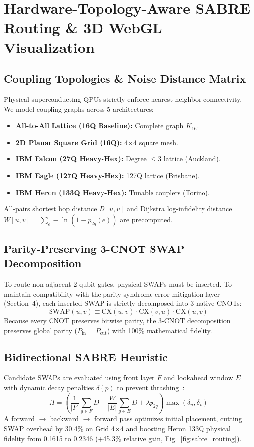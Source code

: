 \documentclass[10pt,twocolumn,letterpaper]{article}
\begin{document}
\section{Hardware-Topology-Aware SABRE Routing \& 3D WebGL Visualization}

\subsection{Coupling Topologies \& Noise Distance Matrix}
Physical superconducting QPUs strictly enforce nearest-neighbor connectivity. We model coupling graphs across 5 architectures:
\begin{itemize}[leftmargin=1.15em, itemsep=0.5pt]
    \item \textbf{All-to-All Lattice (16Q Baseline):} Complete graph $K_{16}$.
    \item \textbf{2D Planar Square Grid (16Q):} 4$\times$4 square mesh.
    \item \textbf{IBM Falcon (27Q Heavy-Hex):} Degree $\le 3$ lattice (Auckland).
    \item \textbf{IBM Eagle (127Q Heavy-Hex):} 127Q lattice (Brisbane).
    \item \textbf{IBM Heron (133Q Heavy-Hex):} Tunable couplers (Torino).
\end{itemize}
All-pairs shortest hop distance $D[u, v]$ and Dijkstra log-infidelity distance $W[u, v] = \sum_{e} -\ln(1 - p_{2q}(e))$ are precomputed.

\subsection{Parity-Preserving 3-CNOT SWAP Decomposition}
To route non-adjacent 2-qubit gates, physical SWAPs must be inserted. To maintain compatibility with the parity-syndrome error mitigation layer (Section~4), each inserted SWAP is strictly decomposed into 3 native CNOTs:
\begin{equation}
    \text{SWAP}(u, v) \equiv \text{CX}(u, v) \cdot \text{CX}(v, u) \cdot \text{CX}(u, v)
\end{equation}
Because every CNOT preserves bitwise parity, the 3-CNOT decomposition preserves global parity ($P_{\text{in}} = P_{\text{out}}$) with 100\% mathematical fidelity.

\subsection{Bidirectional SABRE Heuristic}
Candidate SWAPs are evaluated using front layer $F$ and lookahead window $E$ with dynamic decay penalties $\delta(p)$ to prevent thrashing~\cite{li2019sabre}:
\begin{equation}
    H = \left( \frac{1}{|F|} \sum_{g \in F} D + \frac{W}{|E|} \sum_{g \in E} D + \lambda p_{2q} \right) \max(\delta_u, \delta_v)
\end{equation}
A forward $\to$ backward $\to$ forward pass optimizes initial placement, cutting SWAP overhead by 30.4\% on Grid 4$\times$4 and boosting Heron 133Q physical fidelity from 0.1615 to 0.2346 (+45.3\% relative gain, Fig.~\ref{fig:sabre_routing}).
\end{document}

